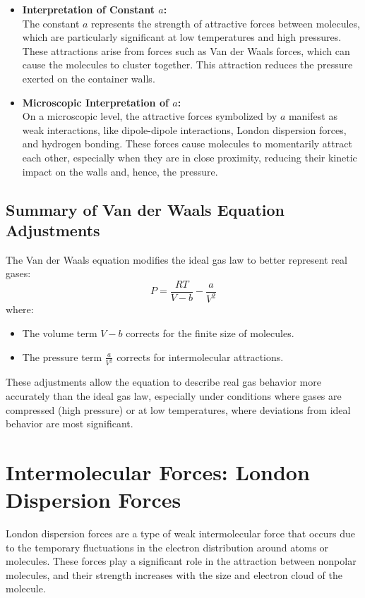 \documentclass{report}
\begin{document}
\begin{itemize}
	\item \textbf{Interpretation of Constant \( a \):} \\
	      The constant \( a \) represents the strength of attractive forces between molecules, which are particularly significant at low temperatures and high pressures. These attractions arise from forces such as Van der Waals forces, which can cause the molecules to cluster together. This attraction reduces the pressure exerted on the container walls.

	\item \textbf{Microscopic Interpretation of \( a \):} \\
	      On a microscopic level, the attractive forces symbolized by \( a \) manifest as weak interactions, like dipole-dipole interactions, London dispersion forces, and hydrogen bonding. These forces cause molecules to momentarily attract each other, especially when they are in close proximity, reducing their kinetic impact on the walls and, hence, the pressure.
\end{itemize}

\subsection{Summary of Van der Waals Equation Adjustments}

The Van der Waals equation modifies the ideal gas law to better represent real gases:
\[
	P = \frac{RT}{V - b} - \frac{a}{V^2}
\]
where:
\begin{itemize}
	\item The volume term \( V - b \) corrects for the finite size of molecules.
	\item The pressure term \( \frac{a}{V^2} \) corrects for intermolecular attractions.
\end{itemize}

These adjustments allow the equation to describe real gas behavior more accurately than the ideal gas law, especially under conditions where gases are compressed (high pressure) or at low temperatures, where deviations from ideal behavior are most significant.

\section{Intermolecular Forces: London Dispersion Forces}

London dispersion forces are a type of weak intermolecular force that occurs due to the temporary fluctuations in the electron distribution around atoms or molecules. These forces play a significant role in the attraction between nonpolar molecules, and their strength increases with the size and electron cloud of the molecule.
\end{document}
